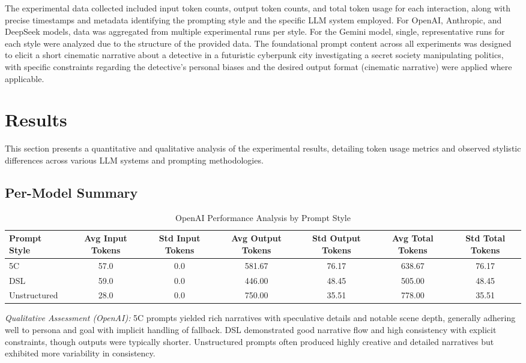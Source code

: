 \documentclass[10pt, a4paper]{article}
\begin{document}
The experimental data collected included input token counts, output token counts, and total token usage for each interaction, along with precise timestamps and metadata identifying the prompting style and the specific LLM system employed. For OpenAI, Anthropic, and DeepSeek models, data was aggregated from multiple experimental runs per style. For the Gemini model, single, representative runs for each style were analyzed due to the structure of the provided data. The foundational prompt content across all experiments was designed to elicit a short cinematic narrative about a detective in a futuristic cyberpunk city investigating a secret society manipulating politics, with specific constraints regarding the detective's personal biases and the desired output format (cinematic narrative) were applied where applicable.

\section{Results}
This section presents a quantitative and qualitative analysis of the experimental results, detailing token usage metrics and observed stylistic differences across various LLM systems and prompting methodologies.

\subsection{Per-Model Summary}

\begin{table}[H]
    \centering
    \caption{OpenAI Performance Analysis by Prompt Style}
    \label{tab:openai_performance}
    \begin{adjustbox}{max width=\linewidth}
    \begin{tabular}{@{}lcccccc@{}}
        \toprule
        \textbf{Prompt Style} & \textbf{Avg Input Tokens} & \textbf{Std Input Tokens} & \textbf{Avg Output Tokens} & \textbf{Std Output Tokens} & \textbf{Avg Total Tokens} & \textbf{Std Total Tokens} \\
        \midrule
        5C           & 57.0 & 0.0 & 581.67 & 76.17 & 638.67 & 76.17 \\
        DSL          & 59.0 & 0.0 & 446.00 & 48.45 & 505.00 & 48.45 \\
        Unstructured & 28.0 & 0.0 & 750.00 & 35.51 & 778.00 & 35.51 \\
        \bottomrule
    \end{tabular}
    \end{adjustbox}
    \vspace{4pt}
    \parbox{\linewidth}{\small\textit{Qualitative Assessment (OpenAI):} 5C prompts yielded rich narratives with speculative details and notable scene depth, generally adhering well to persona and goal with implicit handling of fallback. DSL demonstrated good narrative flow and high consistency with explicit constraints, though outputs were typically shorter. Unstructured prompts often produced highly creative and detailed narratives but exhibited more variability in consistency.}
\end{table}
\end{document}
